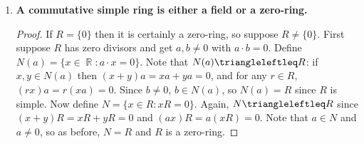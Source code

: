 \documentclass[12pt, a4paper]{article}
\DeclareMathOperator{\R}{\mathbb{R}}
\theoremstyle{nonumberplain}
\newtheorem{proof}{Proof}
\begin{document}
\begin{enumerate}
\begin{proof}
            Now, let's define $\phi:M\times N\to G$ by $\phi(m,n)=m\cdot n$.
            Since $M\cdot N=G$, $\phi$ is surjective, so let's check injectivity.
            We have using the identity proved earlier
            \begin{align*}
                \phi(m_1,n_1)=\phi(m_2,n_2) &\Longrightarrow m_1n_1=m_2n_2\\
                                            &\Longrightarrow m_2^{-1}m_1=n_2n_1^{-1}\\
                                            &\Longrightarrow m_1m_2^{-1},n_1n_2^{-1}\in M\cap N\\
                                            &\Longrightarrow m_1m_2^{-1}=1,n_1n_2^{-1}\\
                                            &\Longrightarrow (m_1,n_1)=(m_2,n_2)
            \end{align*}
            so it remains to show that $\phi$ is a homomorphism.
            Indeed,
            \begin{align*}
                \phi((m_1,n_1)\cdot(m_2,n_2)) &= \phi(m_1m_2,n_1n_2)\\
                                              &= m_1m_2n_1n_2\\
                                              &= m_1n_1m_2n_2\\
                                              &= \phi(m_1,n_1)\phi(m_2,n_2)
            \end{align*}
            by the claim proven earlier, as required.
        \end{proof}
    \item \textbf{A commutative simple ring is either a field or a zero-ring.}
        \begin{proof}
            If $R=\{0\}$ then it is certainly a zero-ring, so suppose $R\neq\{0\}$.
            First suppose $R$ has zero divisors and get $a,b\neq 0$ with $a\cdot b=0$.
            Define $N(a)=\{x\in\R:a\cdot x=0\}$.
            Note that $N(a)\triangleleftleq R$: if $x,y\in N(a)$ then $(x+y)a=xa+ya=0$, and for any $r\in R$, $(rx)a=r(xa)=0$.
            Since $b\neq 0$, $b\in N(a)$, so $N(a)=R$ since $R$ is simple.
            Now define $N=\{x\in R:xR=0\}$.
            Again, $N\triangleleftleq R$ since $(x+y)R=xR+yR=0$ and $(ax)R=a(xR)=0$.
            Note that $a\in N$ and $a\neq 0$, so as before, $N=R$ and $R$ is a zero-ring.


\end{proof}
\end{enumerate}
\end{document}
